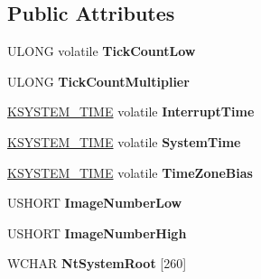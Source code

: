 \subsection*{Public Attributes}
\begin{DoxyCompactItemize}
\item 
\hypertarget{struct__KUSER__SHARED__DATA_a8f0cdebd6c90d29286293bf64a73faf1}{}U\+L\+O\+N\+G volatile {\bfseries Tick\+Count\+Low}\label{struct__KUSER__SHARED__DATA_a8f0cdebd6c90d29286293bf64a73faf1}

\item 
\hypertarget{struct__KUSER__SHARED__DATA_a69d6b19fce54de8037e382d9f2a15df4}{}U\+L\+O\+N\+G {\bfseries Tick\+Count\+Multiplier}\label{struct__KUSER__SHARED__DATA_a69d6b19fce54de8037e382d9f2a15df4}

\item 
\hypertarget{struct__KUSER__SHARED__DATA_a512f915ec3c60d1ca143d8b98d84f603}{}\hyperlink{struct__KSYSTEM__TIME}{K\+S\+Y\+S\+T\+E\+M\+\_\+\+T\+I\+M\+E} volatile {\bfseries Interrupt\+Time}\label{struct__KUSER__SHARED__DATA_a512f915ec3c60d1ca143d8b98d84f603}

\item 
\hypertarget{struct__KUSER__SHARED__DATA_a0054d8f1f96e64361a0d6f13b8706249}{}\hyperlink{struct__KSYSTEM__TIME}{K\+S\+Y\+S\+T\+E\+M\+\_\+\+T\+I\+M\+E} volatile {\bfseries System\+Time}\label{struct__KUSER__SHARED__DATA_a0054d8f1f96e64361a0d6f13b8706249}

\item 
\hypertarget{struct__KUSER__SHARED__DATA_a95e8461636377cfc276390e7087aa444}{}\hyperlink{struct__KSYSTEM__TIME}{K\+S\+Y\+S\+T\+E\+M\+\_\+\+T\+I\+M\+E} volatile {\bfseries Time\+Zone\+Bias}\label{struct__KUSER__SHARED__DATA_a95e8461636377cfc276390e7087aa444}

\item 
\hypertarget{struct__KUSER__SHARED__DATA_afe880851549c64dc9f17c8a896fdbf65}{}U\+S\+H\+O\+R\+T {\bfseries Image\+Number\+Low}\label{struct__KUSER__SHARED__DATA_afe880851549c64dc9f17c8a896fdbf65}

\item 
\hypertarget{struct__KUSER__SHARED__DATA_aaff7347fe74368e6ad28f98350fb665b}{}U\+S\+H\+O\+R\+T {\bfseries Image\+Number\+High}\label{struct__KUSER__SHARED__DATA_aaff7347fe74368e6ad28f98350fb665b}

\item 
\hypertarget{struct__KUSER__SHARED__DATA_aabad46c463568695474dea6846cdbe1e}{}W\+C\+H\+A\+R {\bfseries Nt\+System\+Root} \mbox{[}260\mbox{]}\label{struct__KUSER__SHARED__DATA_aabad46c463568695474dea6846cdbe1e}


\end{DoxyCompactItemize}
